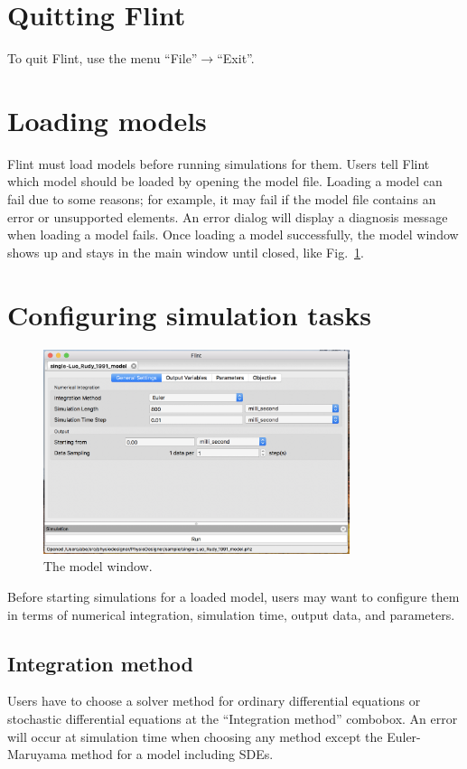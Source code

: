 \documentclass[a4paper,10pt]{report}
\begin{document}
\section{Quitting Flint}
\label{sec:org19aec41}
To quit Flint, use the menu ``File''\(\to\)``Exit''.

\section{Loading models}
\label{sec:orgb1a7398}
Flint must load models before running simulations for them.
Users tell Flint which model should be loaded by opening the model file.
Loading a model can fail due to some reasons; for example, it may fail if
the model file contains an error or unsupported elements.
An error dialog will display a diagnosis message when loading a model fails.
Once loading a model successfully, the model window shows up and stays
in the main window until closed, like Fig.~\ref{fig:orga21bc34}.

\section{Configuring simulation tasks}
\label{sec:org0ddb7c0}

\begin{figure}[htbp]
\centering
\includegraphics[width=0.8\textwidth]{image/lr.png}
\caption{\label{fig:orga21bc34}The model window.}
\end{figure}

Before starting simulations for a loaded model, users may want to configure them
in terms of numerical integration, simulation time, output data, and parameters.

\subsection{Integration method}
\label{sec:org9f866a5}
Users have to choose a solver method for ordinary differential equations or
stochastic differential equations at the ``Integration method'' combobox.
An error will occur at simulation time when choosing any method except
the Euler-Maruyama method for a model including SDEs.
\end{document}

